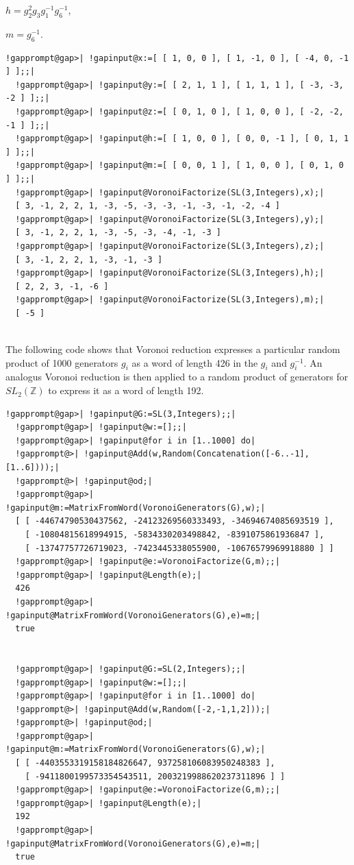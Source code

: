 \documentclass[a4paper,11pt]{report}
\begin{document}
{{{ $h= g_2^2g_3g_1^{-1}g_6^{-1}$, 

 $m=g_6^{-1}$. 
\begin{Verbatim}[commandchars=!@|,fontsize=\small,frame=single,label=Example]
  !gapprompt@gap>| !gapinput@x:=[ [ 1, 0, 0 ], [ 1, -1, 0 ], [ -4, 0, -1 ] ];;|
  !gapprompt@gap>| !gapinput@y:=[ [ 2, 1, 1 ], [ 1, 1, 1 ], [ -3, -3, -2 ] ];;|
  !gapprompt@gap>| !gapinput@z:=[ [ 0, 1, 0 ], [ 1, 0, 0 ], [ -2, -2, -1 ] ];;|
  !gapprompt@gap>| !gapinput@h:=[ [ 1, 0, 0 ], [ 0, 0, -1 ], [ 0, 1, 1 ] ];;|
  !gapprompt@gap>| !gapinput@m:=[ [ 0, 0, 1 ], [ 1, 0, 0 ], [ 0, 1, 0 ] ];;|
  !gapprompt@gap>| !gapinput@VoronoiFactorize(SL(3,Integers),x);|
  [ 3, -1, 2, 2, 1, -3, -5, -3, -3, -1, -3, -1, -2, -4 ]
  !gapprompt@gap>| !gapinput@VoronoiFactorize(SL(3,Integers),y);|
  [ 3, -1, 2, 2, 1, -3, -5, -3, -4, -1, -3 ]
  !gapprompt@gap>| !gapinput@VoronoiFactorize(SL(3,Integers),z);|
  [ 3, -1, 2, 2, 1, -3, -1, -3 ]
  !gapprompt@gap>| !gapinput@VoronoiFactorize(SL(3,Integers),h);|
  [ 2, 2, 3, -1, -6 ]
  !gapprompt@gap>| !gapinput@VoronoiFactorize(SL(3,Integers),m);|
  [ -5 ]
  
\end{Verbatim}
 The following code shows that Voronoi reduction expresses a particular random
product of 1000 generators $g_i$ as a word of length 426 in the $g_i$ and $g_i^{-1}$. An analogus Voronoi reduction is then applied to a random product of
generators for $SL_2(\mathbb Z)$ to express it as a word of length 192. 
\begin{Verbatim}[commandchars=!@|,fontsize=\small,frame=single,label=Example]
  !gapprompt@gap>| !gapinput@G:=SL(3,Integers);;|
  !gapprompt@gap>| !gapinput@w:=[];;|
  !gapprompt@gap>| !gapinput@for i in [1..1000] do|
  !gapprompt@>| !gapinput@Add(w,Random(Concatenation([-6..-1],[1..6])));|
  !gapprompt@>| !gapinput@od;|
  !gapprompt@gap>| !gapinput@m:=MatrixFromWord(VoronoiGenerators(G),w);|
  [ [ -44674790530437562, -24123269560333493, -34694674085693519 ], 
    [ -10804815618994915, -5834330203498842, -8391075861936847 ], 
    [ -13747757726719023, -7423445338055900, -10676579969918880 ] ]
  !gapprompt@gap>| !gapinput@e:=VoronoiFactorize(G,m);;|
  !gapprompt@gap>| !gapinput@Length(e);|
  426
  !gapprompt@gap>| !gapinput@MatrixFromWord(VoronoiGenerators(G),e)=m;|
  true
  
  
  !gapprompt@gap>| !gapinput@G:=SL(2,Integers);;|
  !gapprompt@gap>| !gapinput@w:=[];;|
  !gapprompt@gap>| !gapinput@for i in [1..1000] do|
  !gapprompt@>| !gapinput@Add(w,Random([-2,-1,1,2]));|
  !gapprompt@>| !gapinput@od;|
  !gapprompt@gap>| !gapinput@m:=MatrixFromWord(VoronoiGenerators(G),w);|
  [ [ -4403553319158184826647, 937258106083950248383 ], 
    [ -9411800199573354543511, 2003219988620237311896 ] ]
  !gapprompt@gap>| !gapinput@e:=VoronoiFactorize(G,m);;|
  !gapprompt@gap>| !gapinput@Length(e);|
  192
  !gapprompt@gap>| !gapinput@MatrixFromWord(VoronoiGenerators(G),e)=m;|
  true
  
  
\end{Verbatim}
 }

 }

 }
\end{document}
